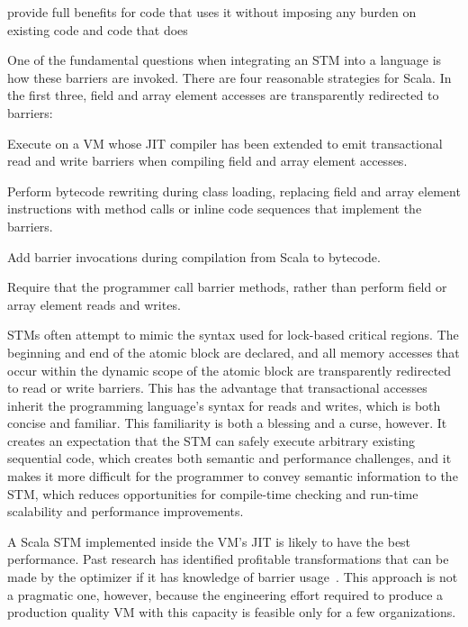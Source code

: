 provide full benefits for code
that uses it without imposing any burden on existing code and code that does

One of the
fundamental questions when integrating an STM into a language is how these
barriers are invoked.  There are four reasonable strategies for Scala.  In the
first three, field and array element accesses are transparently redirected to
barriers:
\begin{packed_enum}

\item Execute on a VM whose JIT compiler has been extended to emit
transactional read and write barriers when compiling field and array element
accesses.

\item Perform bytecode rewriting during class loading, replacing field and
array element instructions with method calls or inline code sequences that
implement the barriers.

\item Add barrier invocations during compilation from Scala to bytecode.

\item Require that the programmer call barrier methods, rather than perform
field or array element reads and writes.

\end{packed_enum}

STMs often attempt to mimic the syntax used for lock-based critical
regions.  The beginning and end of the atomic block are declared, and all
memory accesses that occur within the dynamic scope of the atomic block
are transparently redirected to read or write barriers.  This has the
advantage that transactional accesses inherit the programming language's
syntax for reads and writes, which is both concise and familiar.
This familiarity is both a blessing and a curse, however.  It creates an
expectation that the STM can safely execute arbitrary existing sequential
code, which creates both semantic and performance challenges, and it
makes it more difficult for the programmer to convey semantic information
to the STM, which reduces opportunities for compile-time checking and
run-time scalability and performance improvements.

A Scala STM implemented inside the VM's JIT is likely to have the best
performance.  Past research has identified profitable transformations
that can be made by the optimizer if it has knowledge of barrier
usage~\cite{?}.  This approach is not a pragmatic one, however, because
the engineering effort required to produce a production quality VM with
this capacity is feasible only for a few organizations.

